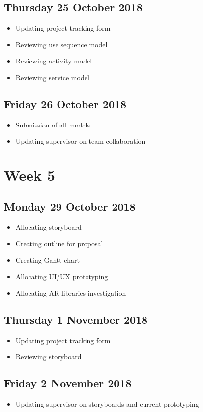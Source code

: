 \subsection*{Thursday 25 October 2018}
\begin{itemize}
	\item Updating project tracking form
	\item Reviewing use sequence model
	\item Reviewing activity model
	\item Reviewing service model 
\end{itemize}

\subsection*{Friday 26 October 2018}
\begin{itemize}
	\item Submission of all models
	\item Updating supervisor on team collaboration
\end{itemize}

\section*{Week 5}
\subsection*{Monday 29 October 2018}
\begin{itemize}
	\item Allocating storyboard
	\item Creating outline for proposal
	\item Creating Gantt chart
	\item Allocating UI/UX prototyping
	\item Allocating AR libraries investigation
\end{itemize}

\subsection*{Thursday 1 November 2018}
\begin{itemize}
	\item Updating project tracking form
	\item Reviewing storyboard
\end{itemize}

\subsection*{Friday 2 November 2018}
\begin{itemize}
	\item Updating supervisor on storyboards and current prototyping
\end{itemize}

